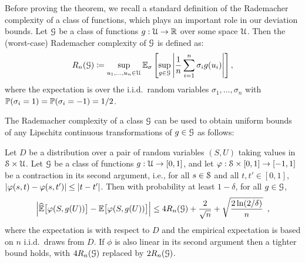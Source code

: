 Before proving the theorem, we recall a standard definition of the Rademacher complexity of a class of functions, which plays an important role in our deviation bounds. Let $\calG$ be a class of functions $g:\calU\to\R$ over some space $\calU$. Then the (worst-case) Rademacher complexity of $\calG$ is defined as:
\begin{equation}
R_n(\calG)
\coloneqq
\sup_{u_1,\ldots,u_n \in \calU} \E_{\sigma} \left[\sup_{g \in \calG} \left|\frac{1}{n} \sum_{i=1}^n \sigma_i g(u_i)\right|\right],
\label{eqn:rademacher}
\end{equation}
%
where the expectation is over the i.i.d.\ random variables $\sigma_1,\ldots,\sigma_n$ with $\P(\sigma_i = 1) = \P(\sigma_i = -1) = 1/2$.

The Rademacher complexity of a class $\calG$ can be used to obtain uniform bounds of any Lipschitz continuous
transformations of $g\in\calG$ as follows:
%
\begin{lemma}%
\label{lemma:dev}
Let $D$ be a distribution over a pair of random
variables $(S,U)$ taking values in $\calS\times\calU$.
Let $\calG$ be a class of functions $g:\calU\to[0,1]$, and let $\phi:\calS\times[0,1]\to[-1,1]$ be a contraction in its second argument, i.e.,
for all $s\in\calS$ and all $t,t'\in[0,1]$, $\abs{\phi(s,t)-\phi(s,t')}\le\abs{t-t'}$.
Then with probability at least $1-\delta$, for all $g\in\calG$,
  \[
  \BigAbs{
     \Ehat\bigBracks{\phi(S,g(U))}-\E\bigBracks{\phi(S,g(U))}
  }
  \le
     4R_n(\calG) + \frac{2}{\sqrt{n}} + \sqrt{\frac{2\ln(2/\delta)}{n}}
\enspace,
  \]
where the expectation is with respect to $D$ and the empirical expectation is based on $n$ i.i.d.\ draws from $D$. If $\phi$ is also linear in its second argument then a tighter bound holds, with $4R_n(\calG)$ replaced by $2R_n(\calG)$.
\end{lemma}
